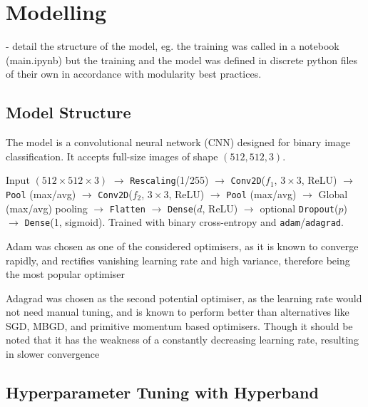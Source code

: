 \section{Modelling}

- detail the structure of the model, eg. the training was called in a notebook (main.ipynb) but the training and the model was defined in discrete python files of their own in accordance with modularity best practices.

\subsection{Model Structure}

The model is a convolutional neural network (CNN) designed for binary image classification. It accepts full-size images of shape $(512, 512, 3)$.

Input $(512\times 512\times 3)$ $\rightarrow$ \texttt{Rescaling}(1/255) $\rightarrow$ 
\texttt{Conv2D}($f_1$, $3{\times}3$, ReLU) $\rightarrow$ \texttt{Pool} (max/avg) $\rightarrow$
\texttt{Conv2D}($f_2$, $3{\times}3$, ReLU) $\rightarrow$ \texttt{Pool} (max/avg) $\rightarrow$
Global (max/avg) pooling $\rightarrow$ \texttt{Flatten} $\rightarrow$
\texttt{Dense}($d$, ReLU) $\rightarrow$ optional \texttt{Dropout}($p$) $\rightarrow$
\texttt{Dense}(1, sigmoid). Trained with binary cross-entropy and \texttt{adam}/\texttt{adagrad}.

Adam was chosen as one of the considered optimisers, as it is known to converge rapidly, and rectifies vanishing learning rate and high variance, therefore being the most popular optimiser \cite{RAIAAN2024100470}

Adagrad was chosen as the second potential optimiser, as the learning rate would not need manual tuning, and is known to perform better than alternatives like SGD, MBGD, and primitive momentum based optimisers. Though it should be noted that it has the weakness of a constantly decreasing learning rate, resulting in slower convergence \cite{RAIAAN2024100470}



\subsection{Hyperparameter Tuning with Hyperband}

